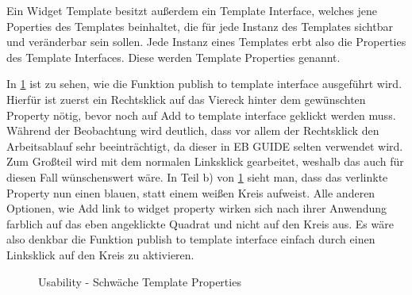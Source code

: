 Ein Widget Template besitzt außerdem ein Template Interface, welches jene Poperties des Templates beinhaltet, die für jede Instanz des Templates sichtbar und veränderbar sein sollen.
Jede Instanz eines Templates erbt also die Properties des Template Interfaces.
Diese werden Template Properties genannt.\cite{studio_guide}

In \cref{fig:TemplateProperties} ist zu sehen, wie die Funktion  \glqq publish to template interface\grqq{} ausgeführt wird.
Hierfür ist zuerst ein Rechtsklick auf das Viereck hinter dem gewünschten Property nötig, bevor noch auf Add to template interface geklickt werden muss.
Während der Beobachtung wird deutlich, dass vor allem der Rechtsklick den Arbeitsablauf sehr beeinträchtigt, da dieser in EB GUIDE selten verwendet wird. 
Zum Großteil wird mit dem normalen Linksklick gearbeitet, weshalb das auch für diesen Fall wünschenswert wäre.
In Teil b) von \cref{fig:TemplateProperties} sieht man, dass das verlinkte Property nun einen blauen, statt einem weißen Kreis aufweist.
Alle anderen Optionen, wie  \glqq Add link to widget property\grqq{} wirken sich nach ihrer Anwendung farblich auf das eben angeklickte Quadrat und nicht auf den Kreis aus.
Es wäre also denkbar die Funktion \glqq publish to template interface\grqq{} einfach durch einen Linksklick auf den Kreis zu aktivieren.

\begin{figure}[H]
  \centering
  \qquad
  \caption{Usability - Schwäche Template Properties}%
  \label{fig:TemplateProperties}
\end{figure}


